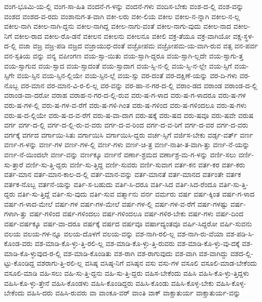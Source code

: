 {ವಂಗ-ಭೂಮಿ-ಯ-ಲ್ಲಿ
ವಂಗ-ಸಾ-ಹಿತಿ
ವಂದನೆ-ಗ-ಳನ್ನು
ವಂದನೆ-ಗಳು
ವಂದಿಸ-ಬೇಕು
ವಂಶ-ದ-ಲ್ಲಿ
ವಂಶ-ವನ್ನು
ವಂಶದ
ವಂಶದ-ವ-ರದು
ವಂಶಾನುಗ-ತ-ವಾಗಿ
ವಕೀ-ಲರು
ವಕೀ-ಲಿಯ
ವಕೀಲ
ವಕೀಲ-ನ-ನ್ನಾಗಿ
ವಕೀಲ-ನ-ಲ್ಲ
ವಕೀಲ-ನಾಗಿ
ವಕೀಲ-ನಾಗಿ-ದ್ದನು
ವಕೀಲ-ನಾಗಿದ್ದ
ವಕೀಲ-ನಾಗು-ವಂತೆ
ವಕೀಲ-ನಾಗು-ವುದು
ವಕೀಲ-ನಾದ
ವಕೀಲ-ನಿಗೆ
ವಕೀಲ-ರಾದ
ವಕೀಲ-ರೊ-ಡನೆ
ವಕೀಲನ
ವಕೀಲನು
ವಕೀಲನೂ
ವಕೀಲಿ
ವಕ್ರ-ತೆಯೂ
ವಕ್ರ-ವಾಗಿಯೋ
ವಕ್ಷ-ಸ್ಥಳ-ದ-ಲ್ಲಿ
ವಜಾ
ವಜ್ರ
ವಜ್ರ-ಪಡಿ
ವಜ್ರದ
ವಜ್ರಾಯುಧ-ದಂತೆ
ವಜ್ರೋಪಮ
ವಜ್ರೋಪಮ-ಯ-ವಾಗಿ-ರುವ
ವತ್ಸ
ವನ-ಪರ್ವ
ವನ-ಸ್ಪತಿಯ
ವನ್ನು
ವನ್ಯ
ವಪೀಂಗಣ
ವಯ-ಸ್ಸಾ-ಯಿತು
ವಯ-ಸ್ಸಾಗಿ-ದ್ದರೂ
ವಯ-ಸ್ಸಾಗಿ-ಲ್ಲದೇ
ವಯ-ಸ್ಸಾಗು-ತ್ತ
ವಯ-ಸ್ಸಾಗುವ
ವಯ-ಸ್ಸಾದ
ವಯ-ಸ್ಸಾದಂತೆ
ವಯ-ಸ್ಸಾದಾಗ
ವಯ-ಸ್ಸಿ-ನ-ಲ್ಲಿ
ವಯ-ಸ್ಸಿ-ನ-ಲ್ಲೇ
ವಯ-ಸ್ಸಿಗೆ
ವಯ-ಸ್ಸಿಗೇ
ವಯ-ಸ್ಸಿನ
ವಯ-ಸ್ಸಿನ-ಲ್ಲಿಯೇ
ವಯ-ಸ್ಸಿನ-ಲ್ಲೆ
ವಯ-ಸ್ಸು
ವರ-ದಂತೆ
ವರ-ದಕ್ಷಿಣೆ-ಯನ್ನು
ವರ-ದಿ-ಗಳು
ವರ-ನೊಬ್ಬ
ವರ-ಮಾನ
ವರ-ಮಾನ-ವಿ-ರ-ಲಿ-ಲ್ಲ
ವರ-ವನ್ನು
ವರ-ಹಾ-ನ-ಗರ-ದ-ಲ್ಲಿ
ವರಾಂ-ಡದ
ವರಾಂಡ
ವರಾಂಡ-ದ-ಲ್ಲಿ
ವರಾಂಡ-ವಾ-ದರೋ
ವರಾಹ
ವರಾಹ-ನ-ಗರ-ದ-ಲ್ಲಿ-ರುವ
ವರು-ಷ-ಗ-ಳಾದ
ವರು-ಷ-ಗ-ಳಾದರೂ
ವರು-ಷ-ಗಳ
ವರು-ಷ-ಗಳ-ಲ್ಲಿ
ವರು-ಷ-ಗಳ-ವ-ರೆಗೆ
ವರು-ಷ-ಗಳಿ-ಗಿಂತ
ವರು-ಷ-ಗಳಿಂದ
ವರು-ಷ-ಗಳಿಂದಲೂ
ವರು-ಷ-ಗಳು
ವರು-ಷ-ದ-ಲ್ಲಿಯೇ
ವರು-ಷ-ದ-ವ-ರೆಗೆ
ವರು-ಷ-ವಾ-ದಾಗ
ವರು-ಷಕ್ಕೆ
ವರು-ಷದ
ವರು-ಷವೂ
ವರು-ಷವೇ
ವರುಷ
ವರ್ಗ
ವರ್ಗ-ದ-ಲ್ಲಿ
ವರ್ಗ-ದ-ಲ್ಲಿ-ರು-ವ-ವರು
ವರ್ಗ-ದ-ವ-ರಿಂದ
ವರ್ಗ-ದ-ವ-ರಿಗೆ
ವರ್ಗ-ದ-ವರ
ವರ್ಗ-ದ-ವರು
ವರ್ಗಕ್ಕೆ
ವರ್ಗದ
ವರ್ಗಾಯಿ-ಸಿತು
ವರ್ಗಾಯಿಸಿ
ವರ್ಗಾಯಿಸಿ-ದ್ದರು
ವರ್ಚ-ಸ್ಸಿಗೆ
ವರ್ಜಿಸ-ಬೇಕು
ವರ್ಡ್ಸ-ವರ್ತ್
ವರ್ಣ
ವರ್ಣ-ಗ-ಳನ್ನು
ವರ್ಣ-ಗಳ
ವರ್ಣ-ಗಳ-ಲ್ಲಿ
ವರ್ಣ-ಗಳು
ವರ್ಣ-ಚಿ-ತ್ರ
ವರ್ಣ-ನಾತೀ-ತ-ವಾಗಿ-ತ್ತು
ವರ್ಣ-ನೆ-ಯನ್ನು
ವರ್ಣ-ನೆ-ಯಿಂದಲೇ
ವರ್ಣ-ವನ್ನು
ವರ್ಣಕ್ಕೂ
ವರ್ಣನೆ
ವರ್ಣಾ-ಶ್ರಮದ
ವರ್ಣಾಶ್ರ-ಮ-ಗ-ಳನ್ನು
ವರ್ಣಿ-ಸಲು
ವರ್ಣಿ-ಸು-ತ್ತಾರೆ
ವರ್ಣಿ-ಸು-ತ್ತಿ-ದ್ದರು
ವರ್ಣಿ-ಸು-ತ್ತಿದ್ದ
ವರ್ಣಿ-ಸುವರು
ವರ್ಣಿ-ಸುವಾಗ
ವರ್ತ-ಕನ
ವರ್ತ-ಕರ
ವರ್ತ-ಕರು
ವರ್ತ-ಮಾನ
ವರ್ತ-ಮಾನ-ಕಾಲ-ದ-ಲ್ಲಿ
ವರ್ತ-ಮಾನ-ವನ್ನು
ವರ್ತ-ಮಾನತೆ
ವರ್ತ-ಮಾನದ
ವರ್ತಂತೇ
ವರ್ತಕ
ವರ್ತಕ-ನೊಬ್ಬ
ವರ್ತನೆ-ಯನ್ನು
ವರ್ತಿ-ಸ-ಬಹುದು
ವರ್ತಿ-ಸಿ-ದರೂ
ವರ್ತಿ-ಸಿದ
ವರ್ತಿ-ಸಿದ-ರೆಂದೂ
ವರ್ತಿ-ಸು-ತ್ತಿ-ದ್ದರು
ವರ್ತಿ-ಸು-ತ್ತಿದ್ದೆ
ವರ್ತಿ-ಸು-ವುದು
ವರ್ತಿ-ಸುವ
ವರ್ತ್ಮಾನು
ವರ್ನ
ವರ್ಮರು
ವರ್ಷ
ವರ್ಷ-ಕ್ಕಿಂತ
ವರ್ಷ-ಗ-ಳಾದ
ವರ್ಷ-ಗ-ಳಾದ-ಮೇಲೆ
ವರ್ಷ-ಗಳ
ವರ್ಷ-ಗಳ-ಮೇಲೆ
ವರ್ಷ-ಗಳ-ಲ್ಲಿ
ವರ್ಷ-ಗಳ-ವ-ರೆಗೆ
ವರ್ಷ-ಗಳಷ್ಟು
ವರ್ಷ-ಗಳಾಗಿ-ತ್ತು
ವರ್ಷ-ಗಳಿಂದ
ವರ್ಷ-ಗಳಿಂದಲು
ವರ್ಷ-ಗಳಿಂದಲೂ
ವರ್ಷ-ಗಳಿರ-ಬೇಕು
ವರ್ಷ-ಗಳು
ವರ್ಷ-ದಿಂದ
ವರ್ಷ-ವರ್ಷಕ್ಕೂ
ವರ್ಷ-ವಾ-ದರೂ
ವರ್ಷಕ್ಕೆ
ವರ್ಷದ
ವರ್ಷವೂ
ವರ್ಷಾದ್ಯಂತವೂ
ವರ್ಷಿ-ಸಿದ್ದರೋ
ವರ್ಷಿ-ಸುವನು
ವಲಯ
ವಲಯ-ಗಳ-ನ್ನೂ
ವಲಯ-ದೊಳಗೆ
ವಲಯ-ವನ್ನು
ವಶ-ನಾಗಿ-ರಲಿ-ಲ್ಲ
ವಶ-ನಾಗಿ-ರು-ವೆಯಾ
ವಶ-ಪಡಿ-ಸಿ-ಕೊಂಡ-ವರು
ವಶ-ಮಾಡಿ-ಕೊ-ಳ್ಳು-ತ್ತಿ-ರಲಿ-ಲ್ಲ
ವಶ-ಮಾಡಿ-ಕೊ-ಳ್ಳು-ತ್ತಿ-ರುವರು
ವಶ-ಮಾಡಿ-ಕೊ-ಳ್ಳು-ವು-ದಕ್ಕೆ
ವಶ-ಮಾಡಿ-ಕೊ-ಳ್ಳುವುದ-ರ-ಲ್ಲಿ
ವಶ-ಮಾಡಿ-ಕೊಂಡಿತು
ವಶ-ರಾಗಿ
ವಶ-ರಾಗುವುದು
ವಶ-ವಾಗಿ
ವಶ-ವಾಗಿದ್ದು
ವಶದ-ಲ್ಲಿ-ಟ್ಟು-ಕೊಂಡಿದ್ದ
ವಶರಾಗು-ತ್ತಿ-ರಲಿ-ಲ್ಲ
ವಸಿಷ್ಠ
ವಸಿಷ್ಠ-ನಿಗೆ
ವಸಿಷ್ಠನ
ವಸು
ವಸು-ಗಳ
ವಸೂಲಿ
ವಸೂಲಿ-ಮಾಡ-ಬೇಕೆಂದು
ವಸೂಲಿ-ಮಾಡಿ
ವಹಿ-ಸಲು
ವಹಿ-ಸು-ತ್ತಿ-ದ್ದನು
ವಹಿ-ಸು-ತ್ತಿ-ದ್ದರು
ವಹಿಸ-ಬೇಕೆಂದು
ವಹಿಸಿ
ವಹಿಸಿ-ಕೊ-ಳ್ಳು-ತ್ತಿದ್ದಳು
ವಹಿಸಿ-ಕೊ-ಳ್ಳು-ತ್ತೇನೆ
ವಹಿಸಿ-ಕೊಂಡಳು
ವಹಿಸಿ-ಕೊಂಡಿದ್ದರು
ವಹಿಸಿ-ಕೊಂಡು
ವಹಿಸಿ-ಕೊಳ್ಳ-ಬೇಕು
ವಹಿಸಿ-ಕೊಳ್ಳ-ಬೇಕೆಂದು
ವಹಿಸಿ-ದರು
ವಹಿಸಿ-ರುವರು
ವಾ
ವಾಂಕೂ-ವರ್
ವಾಂತಿ
ವಾಕ್
ವಾಕ್ಚಾತುರ್ಯ
ವಾಕ್ಚಾತುರ್ಯ-ವನ್ನು
}
